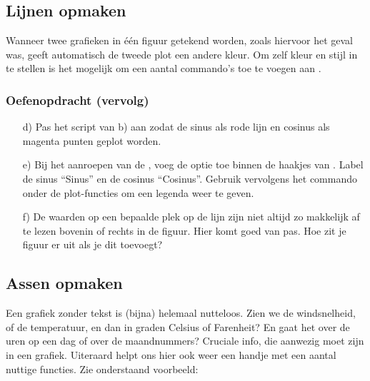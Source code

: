 \documentclass[a4paper,11pt, fleqn]{article}
\begin{document}
\subsection{Lijnen opmaken}
Wanneer twee grafieken in \'e\'en figuur getekend worden, zoals hiervoor het geval was, geeft  automatisch de tweede plot een andere kleur. Om zelf kleur en stijl in te stellen is het mogelijk om een aantal commando's toe te voegen aan .


\subsubsection*{Oefenopdracht (vervolg)}
\begin{itemize}
	\item[d)] Pas het script van b) aan zodat de sinus als rode lijn en cosinus als magenta punten geplot worden.

	\item[e)] Bij het aanroepen van de , voeg de optie  toe binnen de haakjes van . Label de sinus ``Sinus'' en de cosinus ``Cosinus''. Gebruik vervolgens het commando  onder de plot-functies om een legenda weer te geven.
	
	\item[f)] De waarden op een bepaalde plek op de lijn zijn niet altijd zo makkelijk af te lezen bovenin of rechts in de figuur. Hier komt  goed van pas. Hoe zit je figuur er uit als je dit toevoegt?
\end{itemize}

\subsection{Assen opmaken}
Een grafiek zonder tekst is (bijna) helemaal nutteloos. Zien we de windsnelheid, of de temperatuur, en dan in graden Celsius of Farenheit? En gaat het over de uren op een dag of over de maandnummers? Cruciale info, die aanwezig moet zijn in een grafiek. Uiteraard helpt  ons hier ook weer een handje met een aantal nuttige functies. Zie onderstaand voorbeeld:

\end{document}
